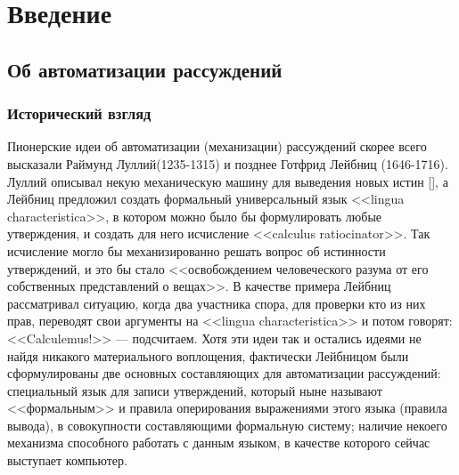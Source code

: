 \chapter{Введение}


\section{Об автоматизации рассуждений}
\subsection{Исторический взгляд}
Пионерские идеи об автоматизации (механизации) рассуждений скорее всего высказали Раймунд Луллий(1235-1315) и позднее Готфрид Лейбниц (1646-1716).  Луллий описывал некую механическую машину для выведения новых истин [], а Лейбниц предложил создать формальный универсальный язык <<lingua characteristica>>, в котором можно было бы формулировать любые утверждения, и создать для него исчисление <<calculus ratiocinator>>. 
Так исчисление могло бы механизированно решать вопрос об истинности утверждений, и это бы стало <<освобождением человеческого разума от его собственных представлений о вещах>>. 
В качестве примера Лейбниц рассматривал ситуацию, когда два участника спора, для проверки кто из них прав, переводят свои аргументы на <<lingua characteristica>> и потом говорят: <<Calculemus!>> --- подсчитаем. 
Хотя эти идеи так и остались идеями не найдя никакого материального воплощения, фактически Лейбницом были сформулированы две основных составляющих для автоматизации рассуждений: специальный язык для записи утверждений, который ныне называют <<формальным>> и правила оперирования выражениями этого языка (правила вывода), в совокупности составляющими формальную систему; наличие некоего механизма способного работать с данным языком, в качестве которого сейчас выступает компьютер. 

